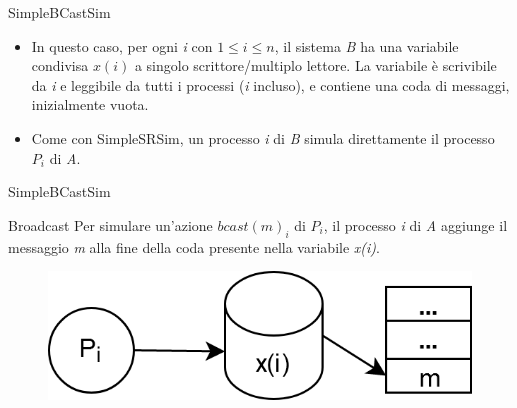 \documentclass{beamer}
\begin{document}
\begin{frame}{SimpleBCastSim}
    \begin{itemize}[<+->]
        \item In questo caso, per ogni \textit{i} con $1 \leq i \leq n$, il sistema \textit{B} ha una variabile condivisa $x(i)$ a singolo scrittore/multiplo lettore.
        \newline La variabile è scrivibile da \textit{i} e leggibile da tutti i processi (\textit{i} incluso), e contiene una coda di messaggi, inizialmente vuota.
        \item Come con SimpleSRSim, un processo \textit{i} di \textit{B} simula direttamente il processo $P_{i}$ di \textit{A}.
    \end{itemize}
\end{frame}

\begin{frame}{SimpleBCastSim}
    \begin{block}{Broadcast}
        Per simulare un'azione $bcast(m)_{i}$ di $P_{i}$, il processo \textit{i} di \textit{A} aggiunge il messaggio \textit{m} alla fine della coda presente nella variabile \textit{x(i)}.
        \begin{figure}
            \centering
            \includegraphics[scale=0.3]{Broadcast.png}
        \end{figure}
    \end{block}
\end{frame}
\end{document}
